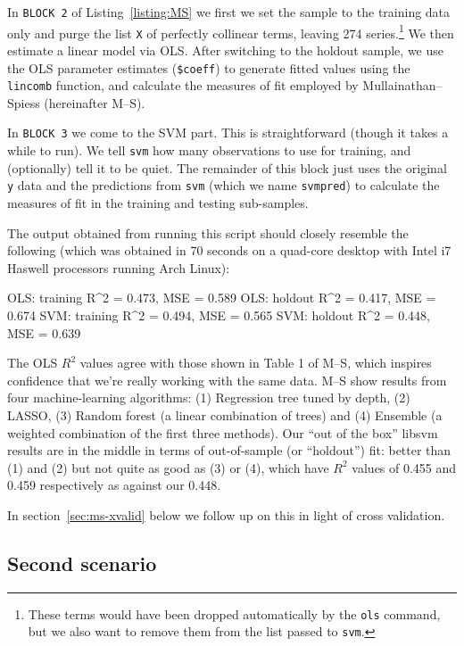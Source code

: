 \documentclass{article}
\begin{document}
In \texttt{BLOCK 2} of Listing~\ref{listing:MS} we first we set the
sample to the training data only and purge the list \texttt{X} of
perfectly collinear terms, leaving 274 series.\footnote{These terms
  would have been dropped automatically by the \texttt{ols} command,
  but we also want to remove them from the list passed to
  \texttt{svm}.}  We then estimate a linear model via OLS. After
switching to the holdout sample, we use the OLS parameter
estimates (\texttt{\$coeff}) to generate fitted values using the
\texttt{lincomb} function, and calculate the measures of fit employed
by Mullainathan--Spiess (hereinafter M--S).

In \texttt{BLOCK 3} we come to the SVM part. This is straightforward
(though it takes a while to run). We tell \texttt{svm} how many
observations to use for training, and (optionally) tell it to be
quiet. The remainder of this block just uses the original \texttt{y}
data and the predictions from \texttt{svm} (which we name
\texttt{svmpred}) to calculate the measures of fit in the training and
testing sub-samples.

The output obtained from running this script should closely resemble
the following (which was obtained in 70 seconds on a quad-core desktop
with Intel i7 Haswell processors running Arch Linux):
\begin{code}
OLS: training R^2 = 0.473, MSE = 0.589
OLS: holdout  R^2 = 0.417, MSE = 0.674
SVM: training R^2 = 0.494, MSE = 0.565
SVM: holdout  R^2 = 0.448, MSE = 0.639
\end{code}
The OLS $R^2$ values agree with those shown in Table 1 of M--S, which
inspires confidence that we're really working with the same data. M--S
show results from four machine-learning algorithms: (1) Regression
tree tuned by depth, (2) LASSO, (3) Random forest (a linear
combination of trees) and (4) Ensemble (a weighted combination of the
first three methods). Our ``out of the box'' \textsf{libsvm} results
are in the middle in terms of out-of-sample (or ``holdout'') fit:
better than (1) and (2) but not quite as good as (3) or (4), which
have $R^2$ values of 0.455 and 0.459 respectively as against our
0.448.

In section~\ref{sec:ms-xvalid} below we follow up on this in light of
cross validation.

\subsection{Second scenario}
\label{sec:s2}
\end{document}
